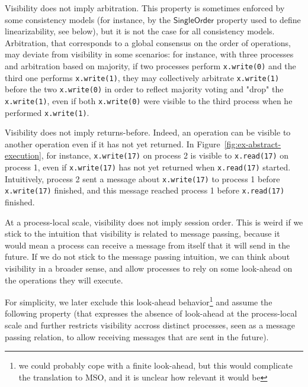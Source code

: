 \begin{remark}\label{rem:arbitration-visibility}
  Visibility does not imply arbitration. This property is sometimes enforced by some consistency models (for instance, by the $\mathsf{SingleOrder}$ property used to define linearizability, see below), but it is not the case for all consistency models. Arbitration, that corresponds to a global consensus on the order of operations, may deviate from visibility in some scenarios: for instance, with three processes and arbitration based on majority, if two processes perform \texttt{x.write(0)} and the third one performs \texttt{x.write(1)}, they may collectively arbitrate \texttt{x.write(1)} before the two \texttt{x.write(0)} in order to reflect majority voting and "drop" the \texttt{x.write(1)}, even if both \texttt{x.write(0)} were visible to the third process when he performed \texttt{x.write(1)}.
\end{remark}

\begin{remark}
  Visibility does not imply returns-before. Indeed, an operation can be visible to another operation even if it has not yet returned. In Figure~\ref{fig:ex-abstract-execution}, for instance, \texttt{x.write(17)} on process 2 is visible to \texttt{x.read(17)} on process 1, even if \texttt{x.write(17)} has not yet returned when \texttt{x.read(17)} started. Intuitively, process 2 sent a message about \texttt{x.write(17)} to process 1 before \texttt{x.write(17)} finished, and this message reached process 1 before \texttt{x.read(17)} finished.
\end{remark}

\begin{remark}
  At a process-local scale, visibility does not imply session order. This is weird if we stick to the intuition that visibility is related to message passing, because it would mean a process can receive a message from itself that it will send in the future. If we do not stick to the message passing intuition, we can think about visibility in a broader sense, and allow processes to rely on some look-ahead on the operations they will execute. 
\end{remark}

For simplicity, we later exclude this look-ahead behavior\footnote{we could probably cope with a finite look-ahead, but this would complicate the translation to MSO, and it is unclear how relevant it would be} and assume the following property (that expresses the absence of look-ahead at the process-local scale and further restricts visibility accross distinct processes, seen as a message passing relation, to allow receiving messages that are sent in the future).


